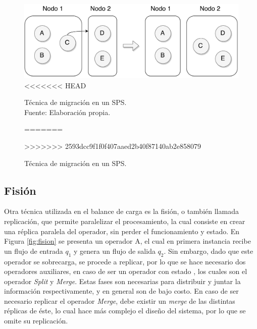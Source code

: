 \begin{figure}[!ht]
	\centering
	\includegraphics[scale=0.45]{images/Migracion.pdf}
<<<<<<< HEAD
	\caption[Técnica de migración en un SPS.]{Técnica de migración en un SPS.\\Fuente: Elaboración propia.}
=======
	\caption{T\'ecnica de migraci\'on en un SPS.}
>>>>>>> 2593dcc9f1f0f407aaed2b40f87140ab2e858079
	\label{fig:migracion}
\end{figure}

\subsection{Fisi\'on}
\label{sec:fisionBC}


Otra t\'ecnica utilizada en el balance de carga es la fisi\'on, o tambi\'en llamada replicaci\'on, que permite paralelizar el procesamiento, la cual consiste en crear una r\'eplica paralela del operador, sin perder el funcionamiento y estado. En Figura \ref{fig:fision} se presenta un operador A, el cual en primera instancia recibe un flujo de entrada $q_1$ y genera un flujo de salida $q_2$. Sin embargo, dado que este operador se sobrecarga, se procede a replicar, por lo que se hace necesario dos operadores auxiliares, \normalsize{en caso de ser un operador con estado} \citep{WuKWO12}, los cuales son el operador \textit{Split} y \textit{Merge}. Estas fases son necesarias para distribuir y juntar la informaci\'on respectivamente, y en general son de bajo costo. En caso de ser necesario replicar el operador \textit{Merge}, debe existir un \textit{merge} de las distintas r\'eplicas de \'este, lo cual hace m\'as complejo el dise\~no del sistema, por lo que se omite su replicaci\'on.

